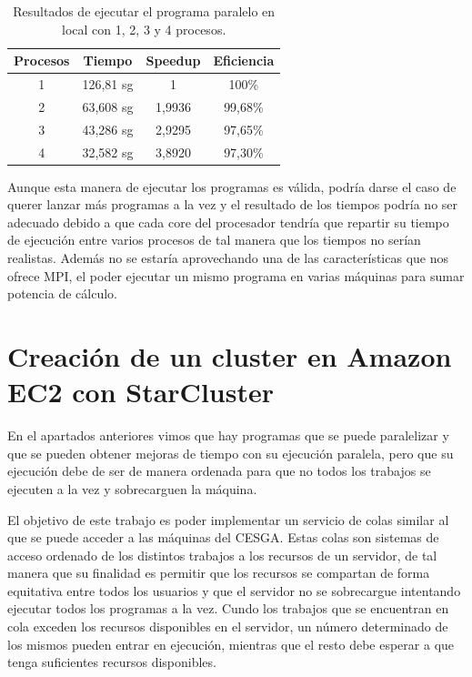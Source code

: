 \documentclass{article}
\begin{document}
\begin{table}[h]
	\begin{center}
		\caption{Resultados de ejecutar el programa paralelo en local con 1, 2, 3 y 4 procesos.}
		\begin{tabular}{|c|c|c|c|}
\hline
\textbf{Procesos} &
\textbf{Tiempo} &
\textbf{Speedup} &
\textbf{Eficiencia} \\ \hline
\hline
1 & 126,81 sg & 1          & 100\% \\ \hline
2 & 63,608 sg & 1,9936 & 99,68\% \\ \hline
3 & 43,286 sg & 2,9295 & 97,65\% \\ \hline
4 & 32,582 sg & 3,8920 & 97,30\% \\ \hline
		\end{tabular}
		\label{tab:resultadosLocal}
	\end{center}
\end{table}

	Aunque esta manera de ejecutar los programas es válida, podría darse el caso de querer lanzar más programas a la vez y el resultado de los tiempos podría no ser adecuado debido a que cada core del procesador tendría que repartir su tiempo de ejecución entre varios procesos de tal manera que los tiempos no serían realistas. Además no se estaría aprovechando una de las características que nos ofrece MPI, el poder ejecutar un mismo programa en varias máquinas para sumar potencia de cálculo.


\clearpage
\section{Creación de un cluster en Amazon EC2 con StarCluster}\label{sec:InstallStarCluster}
	En el apartados anteriores vimos que hay programas que se puede paralelizar y que se pueden obtener mejoras de tiempo con su ejecución paralela, pero que su ejecución debe de ser de manera ordenada para que no todos los trabajos se ejecuten a la vez y sobrecarguen la máquina.

	El objetivo de este trabajo es poder implementar un servicio de colas similar al que se puede acceder a las máquinas del CESGA. Estas colas son  sistemas de acceso ordenado de los distintos trabajos a los recursos de un servidor, de tal manera que su finalidad es permitir que los recursos se compartan de forma equitativa entre todos los usuarios y que el servidor no se sobrecargue intentando ejecutar todos los programas a la vez. Cundo los trabajos que se encuentran en cola exceden los recursos disponibles en el servidor, un número determinado de los mismos pueden entrar en ejecución, mientras que el resto debe esperar a que tenga suficientes recursos disponibles.
\end{document}
